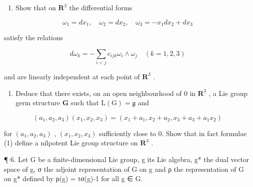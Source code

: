 \begin{enumerate}
\def\labelenumi{(\alph{enumi})}
\tightlist
\item
  Show that on \(\mathbf{R}^3\) the differential forms
\end{enumerate}

\[
\omega_ {1} = d x _ {1}, \quad \omega_ {2} = d x _ {2}, \quad \omega_ {3} = - x _ {1} d x _ {2} + d x _ {3}
\]

satisfy the relations

\[
d \omega_ {k} = - \sum_ {i <   j} c _ {i j k} \omega_ {i} \wedge \omega_ {j} \quad (k = 1, 2, 3)
\]

and are linearly independent at each point of \(\mathbf{R}^3\) .

\begin{enumerate}
\def\labelenumi{(\alph{enumi})}
\setcounter{enumi}{1}
\tightlist
\item
  Deduce that there exists, on an open neighbourhood of 0 in \(\mathbf{R}^3\) , a Lie group germ structure \(\mathbf{G}\) such that \(\mathrm{L}(\mathrm{G}) = \mathfrak{g}\) and
\end{enumerate}

\[
(a _ {1}, a _ {2}, a _ {3}) (x _ {1}, x _ {2}, x _ {3}) = (x _ {1} + a _ {1}, x _ {2} + a _ {2}, x _ {3} + a _ {3} + a _ {1} x _ {2})\tag{1}
\]

for \((a_{1}, a_{2}, a_{3})\) , \((x_{1}, x_{2}, x_{3})\) sufficiently close to 0. Show that in fact formulae (1) define a nilpotent Lie group structure on \(\mathbf{R}^{3}\) .

¶ 6. Let G be a finite-dimensional Lie group, g its Lie algebra, g* the dual vector space of g, σ the adjoint representation of G on g and ρ the representation of G on g* defined by ρ(g) = tσ(g)-1 for all g ∈ G.


